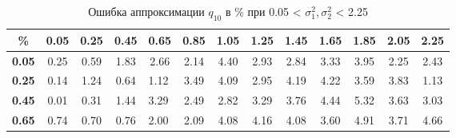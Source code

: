 \documentclass[12pt]{article}
\begin{document}
\begin{table}[!hhh]
	\caption{Ошибка аппроксимации $q_{10}$ в \% при 0.05 < $\sigma_{1}^{2}, \sigma_{2}^{2}$ < 2.25 }
	\label{tab3}
	\begin{tabular}{|c|ccclcccccccc}
		\hline
		\textbf{\%}                         & \multicolumn{1}{c|}{\textbf{0.05}} & \multicolumn{1}{c|}{\textbf{0.25}} & \multicolumn{1}{c|}{\textbf{0.45}} & \multicolumn{1}{l|}{\textbf{0.65}} & \multicolumn{1}{c|}{\textbf{0.85}} & \multicolumn{1}{c|}{\textbf{1.05}} & \multicolumn{1}{c|}{\textbf{1.25}} & \multicolumn{1}{c|}{\textbf{1.45}} & \multicolumn{1}{c|}{\textbf{1.65}} & \multicolumn{1}{c|}{\textbf{1.85}} & \multicolumn{1}{c|}{\textbf{2.05}} & \multicolumn{1}{c|}{\textbf{2.25}} \\ \hline
		\textbf{0.05}                       & 0.25                               & 0.59                               & 1.83                               & \multicolumn{1}{c}{2.66}           & 2.14                               & 4.40                               & 2.93                               & 2.84                               & 3.33                               & 3.95                               & 2.25                               & 2.43                               \\ \cline{1-1}
		\textbf{0.25}                       & 0.14                               & 1.24                               & 0.64                               & 1.12                               & 3.49                               & 4.09                               & 2.95                               & 4.19                               & 4.22                               & 3.59                               & 3.83                               & 1.13                               \\ \cline{1-1}
		\textbf{0.45}                       & 0.01                               & 0.31                               & 1.44                               & 3.29                               & 2.49                               & 2.82                               & 3.29                               & 3.76                               & 4.44                               & 5.32                               & 3.63                               & 3.03                               \\ \cline{1-1}
		\textbf{0.65}                       & 0.74                               & 0.70                               & 0.76                               & 2.00                               & 2.09                               & 4.08                               & 4.16                               & 4.08                               & 3.60                               & 4.91                               & 3.71                               & 4.66                               \\ \cline{1-1}

\end{tabular}
\end{table}
\end{document}
